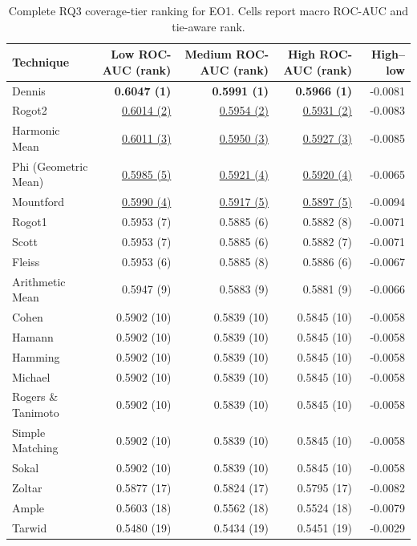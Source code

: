 \begin{table}[t]
\centering
\caption{Complete RQ3 coverage-tier ranking for EO1. Cells report macro ROC-AUC and tie-aware rank.}
\label{tab:rq3-supplementary-rankings-eo1}
{\scriptsize
\setlength{\tabcolsep}{5pt}
\begin{tabular}{lrrrr}
\toprule
Technique & Low ROC-AUC (rank) & Medium ROC-AUC (rank) & High ROC-AUC (rank) & High--low \\
\midrule
Dennis & \textbf{0.6047 (1)} & \textbf{0.5991 (1)} & \textbf{0.5966 (1)} & -0.0081 \\
Rogot2 & \underline{0.6014 (2)} & \underline{0.5954 (2)} & \underline{0.5931 (2)} & -0.0083 \\
Harmonic Mean & \underline{0.6011 (3)} & \underline{0.5950 (3)} & \underline{0.5927 (3)} & -0.0085 \\
Phi (Geometric Mean) & \underline{0.5985 (5)} & \underline{0.5921 (4)} & \underline{0.5920 (4)} & -0.0065 \\
Mountford & \underline{0.5990 (4)} & \underline{0.5917 (5)} & \underline{0.5897 (5)} & -0.0094 \\
Rogot1 & 0.5953 (7) & 0.5885 (6) & 0.5882 (8) & -0.0071 \\
Scott & 0.5953 (7) & 0.5885 (6) & 0.5882 (7) & -0.0071 \\
Fleiss & 0.5953 (6) & 0.5885 (8) & 0.5886 (6) & -0.0067 \\
Arithmetic Mean & 0.5947 (9) & 0.5883 (9) & 0.5881 (9) & -0.0066 \\
Cohen & 0.5902 (10) & 0.5839 (10) & 0.5845 (10) & -0.0058 \\
Hamann & 0.5902 (10) & 0.5839 (10) & 0.5845 (10) & -0.0058 \\
Hamming & 0.5902 (10) & 0.5839 (10) & 0.5845 (10) & -0.0058 \\
Michael & 0.5902 (10) & 0.5839 (10) & 0.5845 (10) & -0.0058 \\
Rogers \& Tanimoto & 0.5902 (10) & 0.5839 (10) & 0.5845 (10) & -0.0058 \\
Simple Matching & 0.5902 (10) & 0.5839 (10) & 0.5845 (10) & -0.0058 \\
Sokal & 0.5902 (10) & 0.5839 (10) & 0.5845 (10) & -0.0058 \\
Zoltar & 0.5877 (17) & 0.5824 (17) & 0.5795 (17) & -0.0082 \\
Ample & 0.5603 (18) & 0.5562 (18) & 0.5524 (18) & -0.0079 \\
Tarwid & 0.5480 (19) & 0.5434 (19) & 0.5451 (19) & -0.0029 \\

\end{tabular}}
\end{table}
